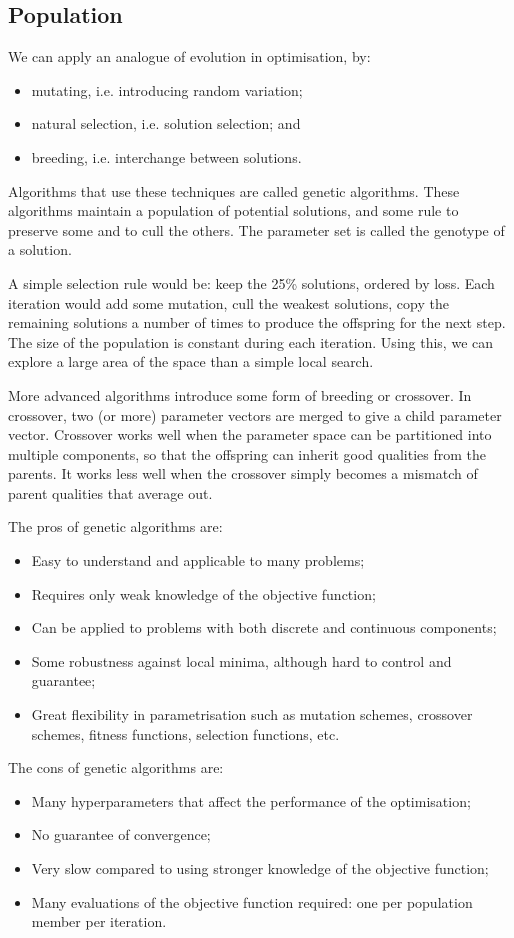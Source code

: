 \documentclass[a4paper, openany]{memoir}
\begin{document}
\subsection{Population}
We can apply an analogue of evolution in optimisation, by:
\begin{itemize}
    \item mutating, i.e. introducing random variation;
    \item natural selection, i.e. solution selection; and
    \item breeding, i.e. interchange between solutions.
\end{itemize}
Algorithms that use these techniques are called genetic algorithms. These algorithms maintain a population of potential solutions, and some rule to preserve some and to cull the others. The parameter set is called the genotype of a solution.

A simple selection rule would be: keep the 25\% solutions, ordered by loss. Each iteration would add some mutation, cull the weakest solutions, copy the remaining solutions a number of times to produce the offspring for the next step. The size of the population is constant during each iteration. Using this, we can explore a large area of the space than a simple local search.

More advanced algorithms introduce some form of breeding or crossover. In crossover, two (or more) parameter vectors are merged to give a child parameter vector. Crossover works well when the parameter space can be partitioned into multiple components, so that the offspring can inherit good qualities from the parents. It works less well when the crossover simply becomes a mismatch of parent qualities that average out.

The pros of genetic algorithms are:
\begin{itemize}
    \item Easy to understand and applicable to many problems;
    \item Requires only weak knowledge of the objective function;
    \item Can be applied to problems with both discrete and continuous components;
    \item Some robustness against local minima, although hard to control and guarantee;
    \item Great flexibility in parametrisation such as mutation schemes, crossover schemes, fitness functions, selection functions, etc.
\end{itemize}
The cons of genetic algorithms are:
\begin{itemize}
    \item Many hyperparameters that affect the performance of the optimisation;
    \item No guarantee of convergence;
    \item Very slow compared to using stronger knowledge of the objective function;
    \item Many evaluations of the objective function required: one per population member per iteration.
\end{itemize}
\end{document}
